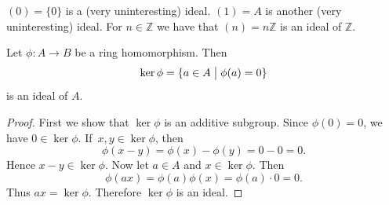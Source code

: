 \begin{ex}
    $(0) = \{0\}$ is a (very uninteresting) ideal. 
    $(1) = A$ is another (very uninteresting) ideal. 
    For $n \in \mathbb Z$ we have that $(n) = n\mathbb Z$ is 
    an ideal of $\mathbb Z$. 
\end{ex}

\begin{prop}
    Let $\phi : A \to B$ be a ring homomorphism. Then 
    \[
        \ker \phi = \{a \in A \bigm| \phi(a) = 0\}
    \]
    is an ideal of $A$.
\end{prop}

\begin{proof}
    First we show that $\ker \phi$ is an additive subgroup. 
    Since $\phi(0) = 0$, we have $0 \in \ker \phi$. 
    If $x,y \in \ker \phi$, then 
    \[
        \phi(x-y) = \phi(x) - \phi(y) = 0 - 0 = 0. 
    \]
    Hence $x-y \in \ker \phi$. 
    Now let $a \in A$ and $x \in \ker \phi$. Then 
    \[
        \phi(ax) = \phi(a)\phi(x) = \phi(a) \cdot 0 = 0. 
    \]
    Thus $ax = \ker \phi$. Therefore $\ker \phi$ is an ideal. 
\end{proof}

